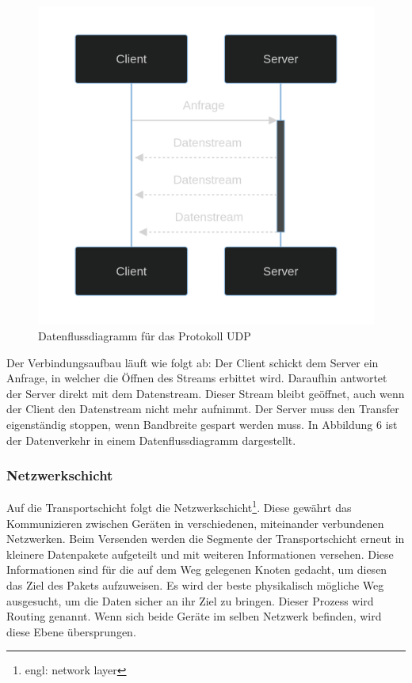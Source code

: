 \documentclass[12pt]{article}
\begin{document}
\begin{figure}
	\centering
	\includegraphics[scale=0.12]{Bilder/Datenfluss_UDP}
	\caption{Datenflussdiagramm für das Protokoll UDP\cite{datenflussdiagramm-udp}}
	\label{fig:figure7}
\end{figure}

Der Verbindungsaufbau läuft wie folgt ab: Der Client schickt dem Server ein Anfrage, in welcher die Öffnen des Streams erbittet wird. Daraufhin antwortet der Server direkt mit dem Datenstream. Dieser Stream bleibt geöffnet, auch wenn der Client den Datenstream nicht mehr aufnimmt. Der Server muss den Transfer eigenständig stoppen, wenn Bandbreite gespart werden muss.
In Abbildung 6 ist der Datenverkehr in einem Datenflussdiagramm dargestellt.\cite{udp-elektronik-kompendium}

\subsubsection{Netzwerkschicht}
	Auf die Transportschicht folgt die Netzwerkschicht\footnote{engl: network layer}. Diese gewährt das Kommunizieren zwischen Geräten in verschiedenen, miteinander verbundenen Netzwerken. Beim Versenden werden die Segmente der Transportschicht erneut in kleinere Datenpakete aufgeteilt und mit weiteren Informationen versehen. Diese Informationen sind für die auf dem Weg gelegenen Knoten gedacht, um diesen das Ziel des Pakets aufzuweisen. Es wird der beste physikalisch mögliche Weg ausgesucht, um die Daten sicher an ihr Ziel zu bringen. Dieser Prozess wird Routing genannt.\cite{routing}
	Wenn sich beide Geräte im selben Netzwerk befinden, wird diese Ebene übersprungen. 
	
\end{document}
